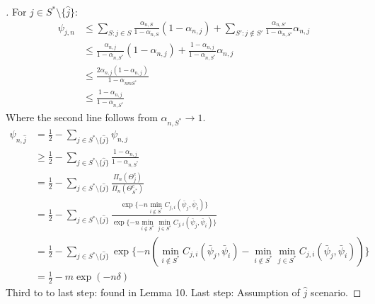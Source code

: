   \begin{proof}[]
    For $j \in S^* \setminus \{\hat{j}\}$:
    \begin{align}
      \psi_{j, n} &\leq \sum_{S: j \in S} \frac{\alpha_{n, S}}{1 - \alpha_{n, S}}(1 - \alpha_{n, j})+ \sum_{S': j \notin S'} \frac{\alpha_{n, S'}}{{1 - \alpha_{n, S'}}}\alpha_{n, j} \\
      &\leq \frac{\alpha_{n, j}}{1 - \alpha_{n, S^*}}(1 - \alpha_{n, j}) + \frac{1 - \alpha_{n, j}}{1 - \alpha_{n, S^*}} \alpha_{n, j} \\
      &\leq \frac{2 \alpha_{n, j}(1 - \alpha_{n, j})}{1 - \alpha_{nm S^*}} \\
      &\leq \frac{1 - \alpha_{n, j}}{1 - \alpha_{n, S^*}}
    \end{align}
    Where the second line follows from $\alpha_{n, S^*} \rightarrow 1$.
    \begin{align}
      \psi_{n, \hat{j}} &= \frac{1}{2} - \sum_{j \in S^* \setminus \{\hat{j}\}} \psi_{n, j}\\
        &\geq \frac{1}{2} - \sum_{j \in S^* \setminus \{\hat{j}\}} \frac{1 - \alpha_{n, j}}{1 - \alpha_{n, S^*}} \\
        &= \frac{1}{2} - \sum_{j \in S^* \setminus \{\hat{j}\}} \frac{\Pi_n(\Theta_j^c)}{\Pi_n(\Theta_{S^*}^c)} \\
        &= \frac{1}{2} - \sum_{j \in S^* \setminus \{\hat{j}\}} \frac{\exp\{-n \min_{i \notin S^*} C_{j, i}(\bar{\psi}_j, \bar{\psi}_i) \}}{\exp\{-n \min_{i \notin S^*} \min_{j \in S^*} C_{j, i}(\bar{\psi}_j, \bar{\psi}_i) \}}\\
        &= \frac{1}{2} - \sum_{j \in S^* \setminus \{\hat{j}\}} \exp\{-n(\min_{i \notin S^*} C_{j, i}(\bar{\psi}_j, \bar{\psi}_i) - \min_{i \notin S^*} \min_{j \in S^*} C_{j, i}(\bar{\psi}_j, \bar{\psi}_i))\} \\
        &= \frac{1}{2} - m \exp(-n\delta)
    \end{align}
    Third to to last step: found in Lemma 10.
    Last step: Assumption of $\hat{j}$ scenario.
  \end{proof}
